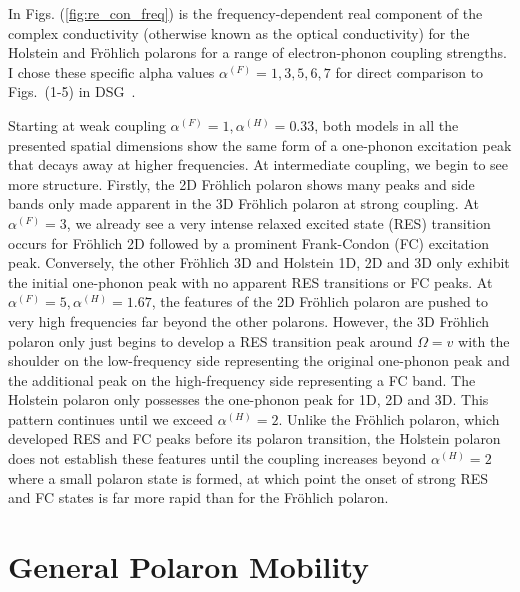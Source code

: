 In Figs. (\ref{fig:re_con_freq}) is the frequency-dependent real component of the complex conductivity (otherwise known as the optical conductivity) for the Holstein and Fr\"ohlich polarons for a range of electron-phonon coupling strengths. I chose these specific alpha values $\alpha^{(F)} = 1, 3, 5, 6, 7$ for direct comparison to Figs.~(1-5) in DSG~\cite{devreese_optical_1972}.

Starting at weak coupling $\alpha^{(F)} = 1, \alpha^{(H)} = 0.33$, both models in all the presented spatial dimensions show the same form of a one-phonon excitation peak that decays away at higher frequencies. At intermediate coupling, we begin to see more structure. Firstly, the 2D Fr\"ohlich polaron shows many peaks and side bands only made apparent in the 3D Fr\"ohlich polaron at strong coupling. At $\alpha^{(F)} = 3$, we already see a very intense relaxed excited state (RES) transition occurs for Fr\"ohlich 2D followed by a prominent Frank-Condon (FC) excitation peak. Conversely, the other Fr\"ohlich 3D and Holstein 1D, 2D and 3D only exhibit the initial one-phonon peak with no apparent RES transitions or FC peaks. At $\alpha^{(F)} = 5, \alpha^{(H)} = 1.67$, the features of the 2D Fr\"ohlich polaron are pushed to very high frequencies far beyond the other polarons. However, the 3D Fr\"ohlich polaron only just begins to develop a RES transition peak around $\Omega = v$ with the shoulder on the low-frequency side representing the original one-phonon peak and the additional peak on the high-frequency side representing a FC band. The Holstein polaron only possesses the one-phonon peak for 1D, 2D and 3D. This pattern continues until we exceed $\alpha^{(H)} = 2$. Unlike the Fr\"ohlich polaron, which developed RES and FC peaks before its polaron transition, the Holstein polaron does not establish these features until the coupling increases beyond $\alpha^{(H)} = 2$ where a small polaron state is formed, at which point the onset of strong RES and FC states is far more rapid than for the Fr\"ohlich polaron. 

\section{General Polaron Mobility}
\label{sec:chap-fifth-first}

